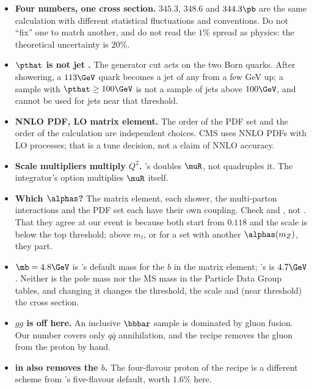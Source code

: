 \begin{pitfalls}
\begin{itemize}[nosep]
  \item \textbf{Four numbers, one cross section.} $345.3$, $348.6$ and
    $344.3\pb$ are the same calculation with different statistical
    fluctuations and conventions. Do not ``fix'' one to match another, and
    do not read the $1\%$ spread as physics: the theoretical uncertainty
    is $20\%$.
  \item \textbf{$\pthat$ is not jet \pt.} The generator cut acts on the two
    Born quarks. After showering, a $113\GeV$ quark becomes a jet of any \pt
    from a few GeV up; a sample with $\pthat\ge100\GeV$ is not a sample of
    jets above $100\GeV$, and cannot be used for jets near that threshold.
  \item \textbf{NNLO PDF, LO matrix element.} The order of the PDF set and the
    order of the calculation are independent choices. CMS uses NNLO PDFs with
    LO \PYTHIA processes; that is a tune decision, not a claim of NNLO accuracy.
  \item \textbf{Scale multipliers multiply $Q^2$.} \PYTHIA's
     doubles $\muR$, not quadruples it. The
    integrator's  option multiplies $\muR$ itself.
  \item \textbf{Which $\alphas$?} The matrix element, each shower, the
    multi-parton interactions and the PDF set each have their own coupling.
    Check  and , not
    . That they agree at our event is because both start from $0.118$ and the scale is below the top threshold; above $m_t$, or for a set with another $\alphas(m_Z)$, they part.
  \item \textbf{$\mb=4.8\GeV$} is \PYTHIA's default mass for the $b$ in the
    matrix element; \MG's is $4.7\GeV$. Neither is the pole mass nor the
    $\overline{\mathrm{MS}}$ mass in the Particle Data Group tables, and
    changing it changes the threshold, the scale and (near threshold) the
    cross section.
  \item \textbf{$gg$ is off here.} An inclusive $\bbbar$ sample is
    dominated by gluon fusion. Our number covers only $q\bar q$ annihilation,
    and the \MG recipe removes the gluon from the proton by hand.
  \item \textbf{ in \MG also removes the $b$.} The
    four-flavour proton of the recipe is a different scheme from \PYTHIA's
    five-flavour default, worth $1.6\%$ here.

\end{itemize}
\end{pitfalls}
